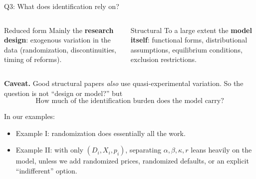 \documentclass[aspectratio=169,11pt]{beamer}
\begin{document}
\begin{frame}{Q3: What does identification rely on?}

\begin{columns}[T]

\begin{block}{Reduced form}
Mainly the \textbf{research design}:
exogenous variation in the data
(randomization, discontinuities, timing of reforms).
\end{block}

\begin{block}{Structural}
To a large extent the \textbf{model itself}:
functional forms, distributional assumptions,
equilibrium conditions, exclusion restrictions.
\end{block}

\end{columns}

\vspace{0.5em}

\textbf{Caveat.} Good structural papers \emph{also} use quasi-experimental
variation. So the question is not ``design or model?'' but
\[
\boxed{\text{How much of the identification burden does the model carry?}}
\]

\vspace{0.2em}

In our examples:
\begin{itemize}
    \item Example I: randomization does essentially all the work.
    \item Example II: with only $(D_i,X_i,p_i)$, separating
    $\alpha,\beta,\kappa,r$ leans heavily on the model,
    unless we add randomized prices, randomized defaults,
    or an explicit ``indifferent'' option.
\end{itemize}

\end{frame}
\end{document}
